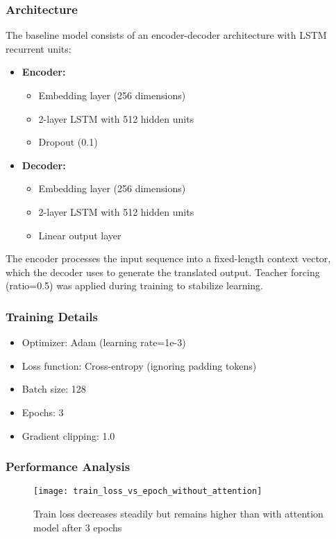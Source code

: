 \documentclass[12pt]{article}
\begin{document}
\subsubsection*{Architecture}
The baseline model consists of an encoder-decoder architecture with LSTM recurrent units:
\begin{itemize}
    \item \textbf{Encoder:} 
        \begin{itemize}
            \item Embedding layer (256 dimensions)
            \item 2-layer LSTM with 512 hidden units
            \item Dropout (0.1)
        \end{itemize}
    \item \textbf{Decoder:}
        \begin{itemize}
            \item Embedding layer (256 dimensions)
            \item 2-layer LSTM with 512 hidden units
            \item Linear output layer
        \end{itemize}
\end{itemize}

The encoder processes the input sequence into a fixed-length context vector, which the decoder uses to generate the translated output. Teacher forcing (ratio=0.5) was applied during training to stabilize learning.

\subsubsection*{Training Details}
\begin{itemize}
    \item Optimizer: Adam (learning rate=1e-3)
    \item Loss function: Cross-entropy (ignoring padding tokens)
    \item Batch size: 128
    \item Epochs: 3
    \item Gradient clipping: 1.0
\end{itemize}

\subsubsection*{Performance Analysis}

\begin{figure}[H]
    \centering
    \texttt{[image: train\_loss\_vs\_epoch\_without\_attention]}
    \caption{Train loss decreases steadily but remains higher than with attention model after 3 epochs}
\end{figure}
\end{document}
